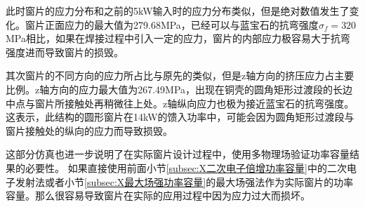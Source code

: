 \documentclass[master]{thesis-uestc}
\begin{document}
此时窗片的应力分布和之前的5kW输入时的应力分布类似，但是绝对数值发生了变化。窗片正面应力的最大值为279.68MPa，已经可以与蓝宝石的抗弯强度\(\sigma_f = 320\)MPa相比，如果在焊接过程中引入一定的应力，窗片的内部应力极容易大于抗弯强度进而导致窗片的损毁。

其次窗片的不同方向的应力所占比与原先的类似，但是z轴方向的挤压应力占主要比例。z轴方向的应力最大值为267.49MPa，出现在铜壳的圆角矩形过渡段的长边中点与窗片所接触处再稍微往上处。z轴纵向应力也极为接近蓝宝石的抗弯强度。这表示，此结构的圆形窗片在14kW的馈入功率中，可能会因为圆角矩形过渡段与窗片接触处的纵向的应力而导致损毁。

这部分仿真也进一步说明了在实际窗片设计过程中，使用多物理场验证功率容量结果的必要性。
如果直接使用前面小节\ref{subsec:X二次电子倍增功率容量}中的二次电子发射法或者小节\ref{subsec:X最大场强功率容量}的最大场强法作为实际窗片的功率容量。那么很容易导致窗片在实际的应用过程中因为应力过大而损坏。
\end{document}
